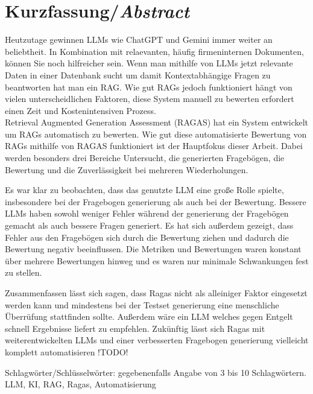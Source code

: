 \chapter*{Kurzfassung/\emph{Abstract}}
\label{chap:abstract}

Heutzutage gewinnen LLMs wie ChatGPT und Gemini immer weiter an beliebtheit. In Kombination mit relaevanten, häufig firmeninternen Dokumenten, können Sie noch hilfreicher sein.
Wenn man mithilfe von LLMs jetzt relevante Daten in einer Datenbank sucht um damit Kontextabhängige Fragen zu beantworten hat man ein RAG.
Wie gut RAGs jedoch funktioniert hängt von vielen unterscheidlichen Faktoren, diese System manuell zu bewerten erfordert einen Zeit und Kostenintensiven Prozess.\\
Retrieval Augmented Generation Assessment (RAGAS) hat ein System entwickelt um RAGs automatisch zu bewerten.
Wie gut diese automatisierte Bewertung von RAGs mithilfe von RAGAS funktioniert ist der Hauptfokus dieser Arbeit. Dabei werden besonders drei Bereiche Untersucht, die generierten Fragebögen, die Bewertung und die Zuverlässigkeit bei mehreren Wiederholungen.

Es war klar zu beobachten, dass das genutzte LLM eine große Rolle spielte, insbesondere bei der Fragebogen generierung als auch bei der Bewertung.
Bessere LLMs haben sowohl weniger Fehler während der generierung der Fragebögen gemacht als auch bessere Fragen generiert.
Es hat sich außerdem gezeigt, dass Fehler aus den Fragebögen sich durch die Bewertung ziehen und dadurch die Bewertung negativ beeinflussen.
Die Metriken und Bewertungen waren konstant über mehrere Bewertungen hinweg und es waren nur minimale Schwankungen fest zu stellen.

Zusammenfassen lässt sich sagen, dass Ragas nicht als alleiniger Faktor eingesetzt werden kann und mindestens bei der Testset generierung eine menschliche Überrüfung stattfinden sollte.
Außerdem wäre ein LLM welches gegen Entgelt schnell Ergebnisse liefert zu empfehlen.
Zukünftig lässt sich Ragas mit weiterentwickelten LLMs und einer verbesserten Fragebogen generierung vielleicht komplett automatisieren
!TODO!




Schlagwörter/Schlüsselwörter: gegebenenfalls Angabe von 3 bis 10 Schlagwörtern.
LLM, KI, RAG, Ragas, Automatisierung